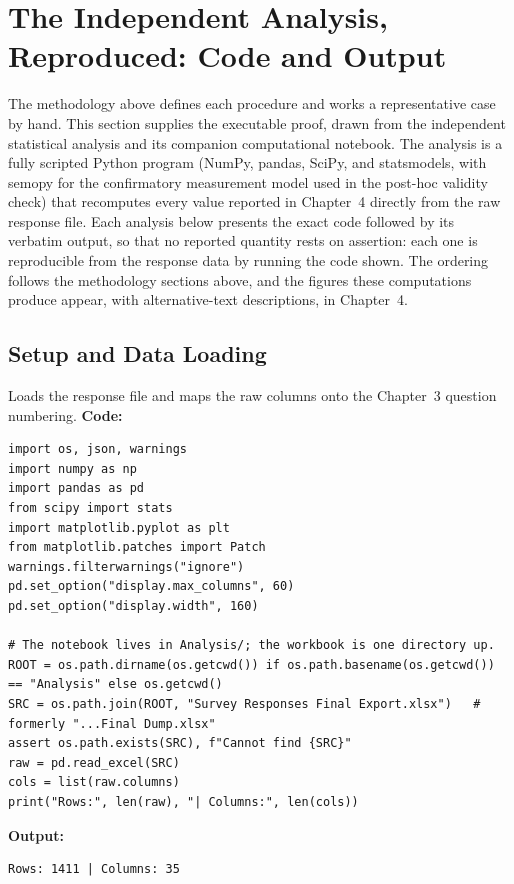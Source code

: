 \section{The Independent Analysis, Reproduced: Code and Output}

The methodology above defines each procedure and works a representative case by hand. This section supplies the executable proof, drawn from the independent statistical analysis and its companion computational notebook. The analysis is a fully scripted Python program (NumPy, pandas, SciPy, and statsmodels, with semopy for the confirmatory measurement model used in the post-hoc validity check) that recomputes every value reported in Chapter~4 directly from the raw response file. Each analysis below presents the exact code followed by its verbatim output, so that no reported quantity rests on assertion: each one is reproducible from the response data by running the code shown. The ordering follows the methodology sections above, and the figures these computations produce appear, with alternative-text descriptions, in Chapter~4.

\subsection{Setup and Data Loading}
Loads the response file and maps the raw columns onto the Chapter~3 question numbering.
\noindent\textbf{Code:}\nopagebreak
{\tiny\begin{verbatim}
import os, json, warnings
import numpy as np
import pandas as pd
from scipy import stats
import matplotlib.pyplot as plt
from matplotlib.patches import Patch
warnings.filterwarnings("ignore")
pd.set_option("display.max_columns", 60)
pd.set_option("display.width", 160)

# The notebook lives in Analysis/; the workbook is one directory up.
ROOT = os.path.dirname(os.getcwd()) if os.path.basename(os.getcwd()) == "Analysis" else os.getcwd()
SRC = os.path.join(ROOT, "Survey Responses Final Export.xlsx")   # formerly "...Final Dump.xlsx"
assert os.path.exists(SRC), f"Cannot find {SRC}"
raw = pd.read_excel(SRC)
cols = list(raw.columns)
print("Rows:", len(raw), "| Columns:", len(cols))
\end{verbatim}}
\noindent\textbf{Output:}\nopagebreak
{\scriptsize\begin{verbatim}
Rows: 1411 | Columns: 35
\end{verbatim}}

